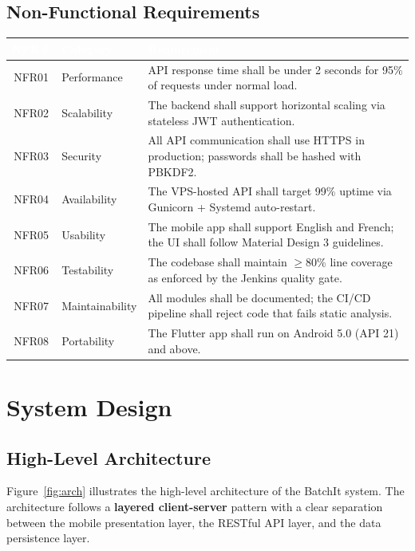 \documentclass[12pt, a4paper]{report}
\begin{document}
\subsection{Non-Functional Requirements}

\begin{tabularx}{\textwidth}{c l X}
\toprule
\rowcolor{tablehead}
\textcolor{white}{\textbf{NFR\#}} &
\textcolor{white}{\textbf{Category}} &
\textcolor{white}{\textbf{Requirement}}\\
\midrule
NFR01 & Performance      & API response time shall be under 2 seconds for 95\% of requests under normal load.\\
\rowcolor{batchitLight}
NFR02 & Scalability      & The backend shall support horizontal scaling via stateless JWT authentication.\\
NFR03 & Security         & All API communication shall use HTTPS in production; passwords shall be hashed with PBKDF2.\\
\rowcolor{batchitLight}
NFR04 & Availability     & The VPS-hosted API shall target 99\% uptime via Gunicorn + Systemd auto-restart.\\
NFR05 & Usability        & The mobile app shall support English and French; the UI shall follow Material Design 3 guidelines.\\
\rowcolor{batchitLight}
NFR06 & Testability      & The codebase shall maintain $\geq$80\% line coverage as enforced by the Jenkins quality gate.\\
NFR07 & Maintainability  & All modules shall be documented; the CI/CD pipeline shall reject code that fails static analysis.\\
\rowcolor{batchitLight}
NFR08 & Portability      & The Flutter app shall run on Android 5.0 (API 21) and above.\\
\bottomrule
\end{tabularx}

\newpage
\section{System Design}

\subsection{High-Level Architecture}

Figure~\ref{fig:arch} illustrates the high-level architecture of the BatchIt system. The architecture follows a \textbf{layered client-server} pattern with a clear separation between the mobile presentation layer, the RESTful API layer, and the data persistence layer.
\end{document}
